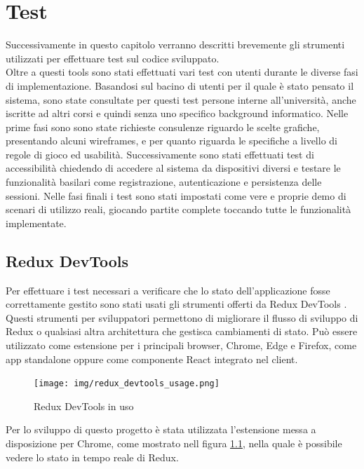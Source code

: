 
\chapter{Test}
Successivamente in questo capitolo verranno descritti brevemente gli strumenti utilizzati per effettuare test sul codice sviluppato.\\[\baselineskip]\indent
Oltre a questi tools sono stati effettuati vari test con utenti durante le diverse fasi di implementazione. Basandosi sul bacino di utenti per il quale è stato pensato il sistema, sono state consultate per questi test persone interne all'università, anche iscritte ad altri corsi e quindi senza uno specifico background informatico.
Nelle prime fasi sono sono state richieste consulenze riguardo le scelte grafiche, presentando alcuni wireframes, e per quanto riguarda le specifiche a livello di regole di gioco ed usabilità. Successivamente sono stati effettuati test di accessibilità chiedendo di accedere al sistema da dispositivi diversi e testare le funzionalità basilari come registrazione, autenticazione e persistenza delle sessioni. Nelle fasi finali i test sono stati impostati come vere e proprie demo di scenari di utilizzo reali, giocando partite complete toccando tutte le funzionalità implementate.
\newpage

\section{Redux DevTools}
Per effettuare i test necessari a verificare che lo stato dell'applicazione fosse correttamente gestito sono stati usati gli strumenti offerti da Redux DevTools \cite{githubGitHubReduxjsreduxdevtools}.
Questi strumenti per sviluppatori permettono di migliorare il flusso di sviluppo di Redux o qualsiasi altra architettura che gestisca cambiamenti di stato. Può essere utilizzato come estensione per i principali browser, Chrome, Edge e Firefox, come app standalone oppure come componente React integrato nel client.

\begin{figure}[H]
\centering
\texttt{[image: img/redux\_devtools\_usage.png]}
\caption{Redux DevTools in uso}
\label{fig:reduxDevTools}
\end{figure}

Per lo sviluppo di questo progetto è stata utilizzata l'estensione messa a disposizione per Chrome, come mostrato nell figura \ref{fig:reduxDevTools}, nella quale è possibile vedere lo stato in tempo reale di Redux.

